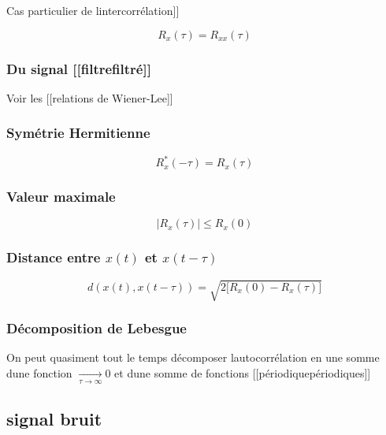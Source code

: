 \documentclass[
]{article}
\begin{document}
Cas particulier de l\textquotesingle{[}{[}intercorrélation{]}{]}

\[
R_x(\tau) = R_{xx}(\tau)
\]

\hypertarget{du-signal-filtrefiltruxe9-2}{%
\subsubsection{Du signal
{[}{[}filtre\textbar filtré{]}{]}}\label{du-signal-filtrefiltruxe9-2}}

Voir les {[}{[}relations de Wiener-Lee{]}{]}

\hypertarget{symuxe9trie-hermitienne}{%
\subsubsection{Symétrie Hermitienne}\label{symuxe9trie-hermitienne}}

\[
R_x^\ast(-\tau) = R_x(\tau)
\]

\hypertarget{valeur-maximale}{%
\subsubsection{Valeur maximale}\label{valeur-maximale}}

\[
|R_x(\tau)| \leq R_x(0)
\]

\hypertarget{distance-entre-xt-et-xt-tau}{%
\subsubsection{\texorpdfstring{Distance entre \(x(t)\) et
\(x(t-\tau)\)}{Distance entre x(t) et x(t-\textbackslash tau)}}\label{distance-entre-xt-et-xt-tau}}

\[
d(x(t), x(t-\tau)) = \sqrt{ 2\Big[R_x(0) - R_x(\tau)\Big] }
\]

\hypertarget{duxe9composition-de-lebesgue}{%
\subsubsection{Décomposition de
Lebesgue}\label{duxe9composition-de-lebesgue}}

On peut quasiment tout le temps décomposer
l\textquotesingle autocorrélation en une somme d\textquotesingle une
fonction \(\xrightarrow[\tau \to \infty]{} 0\) et d\textquotesingle une
somme de fonctions {[}{[}périodique\textbar périodiques{]}{]}

\hypertarget{signal-bruit}{%
\subsection{signal bruit}\label{signal-bruit}}
\end{document}
